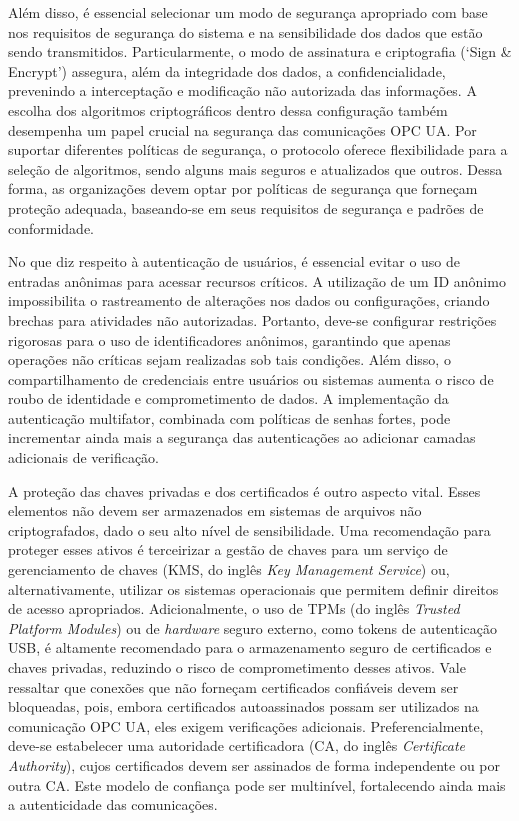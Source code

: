         Além disso, é essencial selecionar um modo de segurança apropriado com base nos requisitos de segurança do sistema e na sensibilidade dos dados que estão sendo transmitidos. Particularmente, o modo de assinatura e criptografia (`Sign \& Encrypt') assegura, além da integridade dos dados, a confidencialidade, prevenindo a interceptação e modificação não autorizada das informações. A escolha dos algoritmos criptográficos dentro dessa configuração também desempenha um papel crucial na segurança das comunicações OPC UA. Por suportar diferentes políticas de segurança, o protocolo oferece flexibilidade para a seleção de algoritmos, sendo alguns mais seguros e atualizados que outros. Dessa forma, as organizações devem optar por políticas de segurança que forneçam proteção adequada, baseando-se em seus requisitos de segurança e padrões de conformidade.
        
        No que diz respeito à autenticação de usuários, é essencial evitar o uso de entradas anônimas para acessar recursos críticos. A utilização de um ID anônimo impossibilita o rastreamento de alterações nos dados ou configurações, criando brechas para atividades não autorizadas. Portanto, deve-se configurar restrições rigorosas para o uso de identificadores anônimos, garantindo que apenas operações não críticas sejam realizadas sob tais condições. Além disso, o compartilhamento de credenciais entre usuários ou sistemas aumenta o risco de roubo de identidade e comprometimento de dados. A implementação da autenticação multifator, combinada com políticas de senhas fortes, pode incrementar ainda mais a segurança das autenticações ao adicionar camadas adicionais de verificação.

        A proteção das chaves privadas e dos certificados é outro aspecto vital. Esses elementos não devem ser armazenados em sistemas de arquivos não criptografados, dado o seu alto nível de sensibilidade. Uma recomendação para proteger esses ativos é terceirizar a gestão de chaves para um serviço de gerenciamento de chaves (KMS, do inglês \textit{Key Management Service}) ou, alternativamente, utilizar os sistemas operacionais que permitem definir direitos de acesso apropriados. Adicionalmente, o uso de TPMs (do inglês \textit{Trusted Platform Modules}) ou de \textit{hardware} seguro externo, como tokens de autenticação USB, é altamente recomendado para o armazenamento seguro de certificados e chaves privadas, reduzindo o risco de comprometimento desses ativos. Vale ressaltar que conexões que não forneçam certificados confiáveis devem ser bloqueadas, pois, embora certificados autoassinados possam ser utilizados na comunicação OPC UA, eles exigem verificações adicionais. Preferencialmente, deve-se estabelecer uma autoridade certificadora (CA, do inglês \textit{Certificate Authority}), cujos certificados devem ser assinados de forma independente ou por outra CA. Este modelo de confiança pode ser multinível, fortalecendo ainda mais a autenticidade das comunicações.

